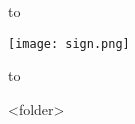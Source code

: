 \bigbreak
\bigbreak
\bigbreak
\bigbreak

\hbox to 
\begin{flushright}
\texttt{[image: sign.png]}
\end{flushright}

\hbox to 

\bigbreak
\bigbreak

<folder>